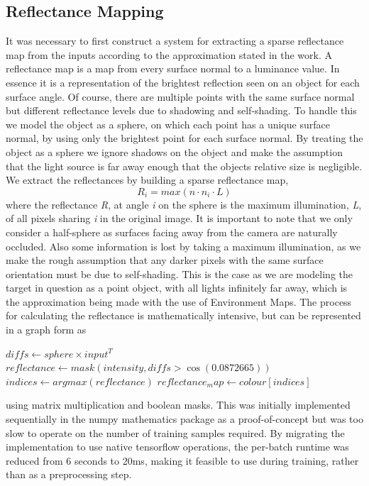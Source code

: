 \documentclass[ %
                    author={Gavin Parker},
                supervisor={Dr. Neill Campbell},
                    degree={MEng},
                     title={Deep Learning for Illumination Estimation from Stereo Images},
                  subtitle={},
                      type={Research},
                      year={2018} ]{dissertation}
\begin{document}
\subsection{Reflectance Mapping}
It was necessary to first construct a system for extracting a sparse reflectance map from the inputs according to the approximation stated in the work. A reflectance map is a map from every surface normal to a luminance value. In essence it is a representation of the brightest reflection seen on an object for each surface angle. Of course, there are multiple points with the same surface normal but different reflectance levels due to shadowing and self-shading. To handle this we model the object as a sphere, on which each point has a unique surface normal, by using only the brightest point for each surface normal. By treating the object as a sphere we ignore shadows on the object and make the assumption that the light source is far away enough that the objects relative size is negligible. We extract the reflectances by building a sparse reflectance map,
\[ R_i = max(n\cdot n_i \cdot L)\]
where the reflectance \textit{R}, at angle \textit{i} on the sphere is the maximum illumination, \textit{L}, of all pixels sharing \textit{i} in the original image. It is important to note that we only consider a half-sphere as surfaces facing away from the camera are naturally occluded. Also some information is lost by taking a maximum illumination, as we make the rough assumption that any darker pixels with the same surface orientation must be due to self-shading. This is the case as we are modeling the target in question as a point object, with all lights infinitely far away, which is the approximation being made with the use of Environment Maps.
\newline
The process for calculating the reflectance is mathematically intensive, but can be represented in a graph form as
\begin{algorithm}
$ diffs \leftarrow sphere \times input^T $\;
$ reflectance \leftarrow mask(intensity, diffs > \cos(0.0872665)) $\;
$ indices \leftarrow argmax(reflectance) $\;
$ reflectance_map \leftarrow colour[indices] $\;
\end{algorithm}
using matrix multiplication and boolean masks. This was initially implemented sequentially in the numpy mathematics package as a proof-of-concept but was too slow to operate on the number of training samples required. By migrating the implementation to use native tensorflow operations, the per-batch runtime was reduced from 6 seconds to 20ms, making it feasible to use during training, rather than as a preprocessing step.
\newpage
\end{document}
